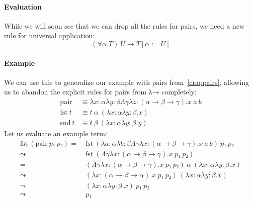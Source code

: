 \documentclass[12pt]{article}
\begin{document}
\paragraph{Evaluation}
While we will soon see that we can drop all the rules for pairs, we need a new rule for universal application:
\[(∀α.T) \ U → T[α:=U]\]
\paragraph{Example}
We can use this to generalize our example with pairs from~\ref{crappairs}, allowing us to abandon the explicit rules for pairs from λ→ completely:
\begin{align*}
    \mathrm{pair} &≡ λx:αλy:βΛγλz:(α → β → γ).x \ a \ b\\
    \mathrm{fst} \ t &≡ t \ α \ (λx:αλy:β.x)\\
    \mathrm{snd} \ t &≡ t \ β \ (λx:αλy:β.y)
\end{align*}
Let us evaluate an example term:
\begin{align*}
    \mathrm{fst} \ (\mathrm{pair} \ p₁ \ p₂) =& \ \mathrm{fst} \ (λa:αλb:βΛγλx:(α → β → γ).x \ a \ b) \ p₁ \ p₂\\
    \leadsto& \ \mathrm{fst} \ (Λγλx:(α → β → γ).x \ p₁ \ p₂)\\
    =& \ (Λγλx:(α → β → γ).x \ p₁ \ p₂) \ α \ (λx:αλy:β.x)\\
    \leadsto& \ (λx:(α → β → α).x \ p₁ \ p₂) \ (λx:αλy:β.x)\\
    \leadsto& \ (λx:αλy:β.x) \ p₁ \ p₂\\
    \leadsto& \ p₁\\
\end{align*}
\end{document}
